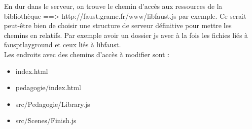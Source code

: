 \documentclass[a4paper]{article}
\begin{document}
En dur dans le serveur, on trouve le chemin d'accès aux ressources de la bibliothèque ==> http://faust.grame.fr/www/libfaust.js par exemple. Ce serait peut-être bien de choisir une structure de serveur définitive pour mettre les chemins en relatifs. Par exemple avoir un dossier js avec à la fois les fichies liés à fausptlayground et ceux liés à libfaust. \\

Les endroits avec des chemins d'accès à modifier sont :
\begin{itemize}
\item index.html
\item pedagogie/index.html
\item src/Pedagogie/Library.js
\item src/Scenes/Finish.js
\end{itemize}
\end{document}
